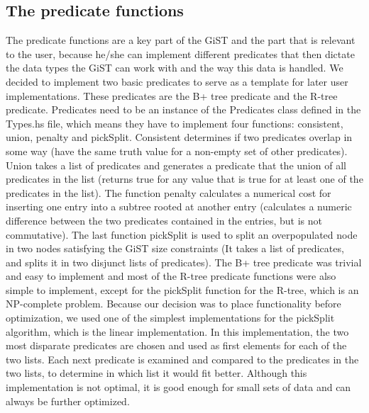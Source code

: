 \documentclass{scrartcl}
\begin{document}
\subsection{The predicate functions}
The predicate functions are a key part of the GiST and the part that is relevant to the user, because he/she can implement different predicates that then dictate the data types the GiST can work with 
and the way this data is handled. We decided to implement two basic predicates to serve as a template for later user implementations. These predicates are the B+ tree predicate and the R-tree predicate.
Predicates need to be an instance of the Predicates class defined in the Types.hs file, which means they have to implement four functions: consistent, union, penalty and pickSplit. Consistent determines
if two predicates overlap in some way (have the same truth value for a non-empty set of other predicates). Union takes a list of predicates and generates a predicate that the union of all predicates in the list
(returns true for any value that is true for at least one of the predicates in the list). The function penalty calculates a numerical cost for inserting one entry into a subtree rooted at another 
entry (calculates a numeric difference between the two predicates contained in the entries, but is not commutative). The last function pickSplit is used to split an overpopulated node in two nodes satisfying
the GiST size constraints (It takes a list of predicates, and splits it in two disjunct lists of predicates). The B+ tree predicate was trivial and easy to implement and most of the R-tree predicate functions were
also simple to implement, except for the pickSplit function for the R-tree, which is an NP-complete problem. Because our decision was to place functionality before optimization, we used one of the simplest implementations
for the pickSplit algorithm, which is the linear implementation. In this implementation, the two most disparate predicates are chosen and used as first elements for each of the two lists. Each next predicate is examined and compared
to the predicates in the two lists, to determine in which list it would fit better. Although this implementation is not optimal, it is good enough for small sets of data and can always be further optimized.
\end{document}
